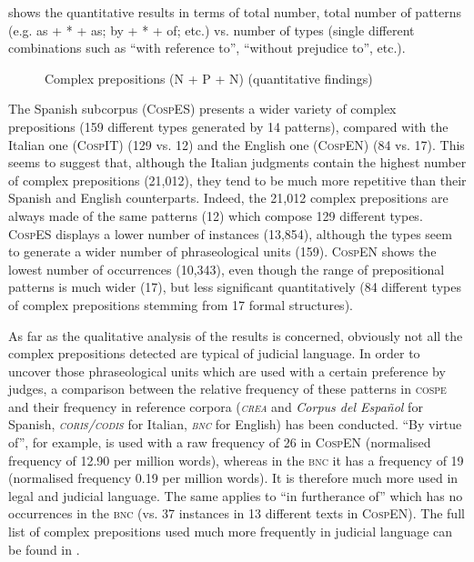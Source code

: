 \documentclass[output=paper]{LSP/langsci}
\begin{document}
 shows the quantitative results in terms of total number, total number of patterns (e.g. as + * + as; by + * + of; etc.) vs. number of types (single different combinations such as “with reference to”, “without prejudice to”, etc.).

\begin{figure}

\caption{Complex prepositions (N + P + N) (quantitative findings)} \label{fig:6:1}
\end{figure}

The Spanish subcorpus (\textsc{CospES}) presents a wider variety of complex prepositions (159 different types generated by 14 patterns), compared with the Italian one (\textsc{\textsc{CospIT}}) (129 vs. 12) and the English one (\textsc{CospEN}) (84 vs. 17). This seems to suggest that, although the Italian judgments contain the highest number of complex prepositions (21,012), they tend to be much more repetitive than their Spanish and English counterparts. Indeed, the 21,012 complex prepositions are always made of the same patterns (12) which compose 129 different types. \textsc{CospES} displays a lower number of instances (13,854), although the types seem to generate a wider number of phraseological units (159). \textsc{CospEN} shows the lowest number of occurrences (10,343), even though the range of prepositional patterns is much wider (17), but less significant quantitatively (84 different types of complex prepositions stemming from 17 formal structures).

As far as the qualitative analysis of the results is concerned, obviously not all the complex prepositions detected are typical of judicial language. In order to uncover those phraseological units which are used with a certain preference by judges, a comparison between the relative frequency of these patterns in \textsc{cospe} and their frequency in reference corpora (\textit{\textsc{crea}} and \textit{Corpus del Español} for Spanish, \textit{\textsc{coris}/\textsc{codis}} for Italian, \textit{\textsc{bnc}} for English) has been conducted. “By virtue of”, for example, is used with a raw frequency of 26 in \textsc{CospEN} (normalised frequency of 12.90 per million words), whereas in the \textsc{bnc} it has a frequency of 19 (normalised frequency 0.19 per million words). It is therefore much more used in legal and judicial language. The same applies to “in furtherance of” which has no occurrences in the \textsc{bnc} (vs. 37 instances in 13 different texts in \textsc{CospEN}). The full list of complex prepositions used much more frequently in judicial language can be found in \citet[200--cd205]{Pontrandolfo2013b}.
\end{document}
